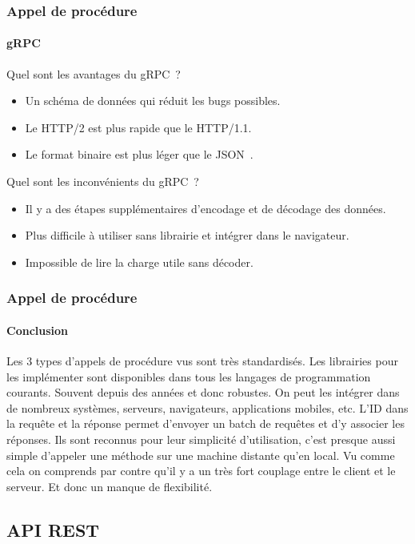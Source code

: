 \documentclass{beamer}
\begin{document}
    \begin{frame}
        \transdissolve
        \frametitle{Appel de procédure}
        \framesubtitle{gRPC}
        Quel sont les avantages du gRPC~?
        \pause
        \bigbreak
        \begin{itemize}
            \item Un schéma de données qui réduit les bugs possibles.
            \item Le HTTP/2 est plus rapide que le HTTP/1.1.
            \item Le format binaire est plus léger que le JSON~.
        \end{itemize}
        \bigbreak
        Quel sont les inconvénients du gRPC~?
        \pause
        \bigbreak
        \begin{itemize}
            \item Il y a des étapes supplémentaires d'encodage et de décodage des données.
            \item Plus difficile à utiliser sans librairie et intégrer dans le navigateur.
            \item Impossible de lire la charge utile sans décoder.
        \end{itemize}
    \end{frame}

    \begin{frame}
        \transdissolve
        \frametitle{Appel de procédure}
        \framesubtitle{Conclusion}
        Les 3 types d'appels de procédure vus sont très standardisés.
        Les librairies pour les implémenter sont disponibles dans tous les langages de programmation courants.
        Souvent depuis des années et donc robustes.
        \bigbreak
        On peut les intégrer dans de nombreux systèmes, serveurs, navigateurs, applications mobiles, etc.
        \bigbreak
        L'ID dans la requête et la réponse permet d'envoyer un batch de requêtes et d'y associer les réponses.
        \bigbreak
        Ils sont reconnus pour leur simplicité d'utilisation, c'est presque aussi simple d'appeler une méthode sur une machine distante qu'en local.
        Vu comme cela on comprends par contre qu'il y a un très fort couplage entre le client et le serveur.
        Et donc un manque de flexibilité.
    \end{frame}

    \subsection{API REST}\label{subsec:api-rest}
\end{document}

